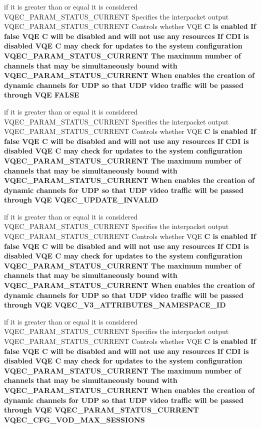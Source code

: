 \begin{CompactItemize}
\item 
if it is greater than or equal it is considered VQEC\_\-PARAM\_\-STATUS\_\-CURRENT Specifies the interpacket output VQEC\_\-PARAM\_\-STATUS\_\-CURRENT Controls whether VQE \bf{C} is enabled If false VQE \bf{C} will be disabled and will not use any resources If CDI is disabled VQE \bf{C} may check for updates \bf{to} the system configuration VQEC\_\-PARAM\_\-STATUS\_\-CURRENT The maximum number of \bf{channels} that may be simultaneously bound with VQEC\_\-PARAM\_\-STATUS\_\-CURRENT When enables the creation of dynamic \bf{channels} for UDP so that UDP video traffic will be passed through VQE \bf{FALSE}
\item 
if it is greater than or equal it is considered VQEC\_\-PARAM\_\-STATUS\_\-CURRENT Specifies the interpacket output VQEC\_\-PARAM\_\-STATUS\_\-CURRENT Controls whether VQE \bf{C} is enabled If false VQE \bf{C} will be disabled and will not use any resources If CDI is disabled VQE \bf{C} may check for updates \bf{to} the system configuration VQEC\_\-PARAM\_\-STATUS\_\-CURRENT The maximum number of \bf{channels} that may be simultaneously bound with VQEC\_\-PARAM\_\-STATUS\_\-CURRENT When enables the creation of dynamic \bf{channels} for UDP so that UDP video traffic will be passed through VQE \bf{VQEC\_\-UPDATE\_\-INVALID}
\item 
if it is greater than or equal it is considered VQEC\_\-PARAM\_\-STATUS\_\-CURRENT Specifies the interpacket output VQEC\_\-PARAM\_\-STATUS\_\-CURRENT Controls whether VQE \bf{C} is enabled If false VQE \bf{C} will be disabled and will not use any resources If CDI is disabled VQE \bf{C} may check for updates \bf{to} the system configuration VQEC\_\-PARAM\_\-STATUS\_\-CURRENT The maximum number of \bf{channels} that may be simultaneously bound with VQEC\_\-PARAM\_\-STATUS\_\-CURRENT When enables the creation of dynamic \bf{channels} for UDP so that UDP video traffic will be passed through VQE \bf{VQEC\_\-V3\_\-ATTRIBUTES\_\-NAMESPACE\_\-ID}
\item 
if it is greater than or equal it is considered VQEC\_\-PARAM\_\-STATUS\_\-CURRENT Specifies the interpacket output VQEC\_\-PARAM\_\-STATUS\_\-CURRENT Controls whether VQE \bf{C} is enabled If false VQE \bf{C} will be disabled and will not use any resources If CDI is disabled VQE \bf{C} may check for updates \bf{to} the system configuration VQEC\_\-PARAM\_\-STATUS\_\-CURRENT The maximum number of \bf{channels} that may be simultaneously bound with VQEC\_\-PARAM\_\-STATUS\_\-CURRENT When enables the creation of dynamic \bf{channels} for UDP so that UDP video traffic will be passed through VQE VQEC\_\-PARAM\_\-STATUS\_\-CURRENT \bf{VQEC\_\-CFG\_\-VOD\_\-MAX\_\-SESSIONS}

\end{CompactItemize}
